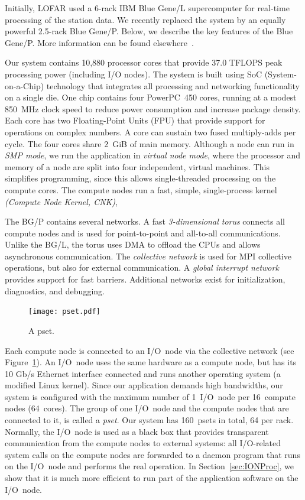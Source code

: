 \documentclass{sig-alternate}
\begin{document}
Initially, LOFAR used a 6-rack IBM Blue Gene/L supercomputer for real-time
processing of the station data.
We recently replaced the system by an equally powerful 2.5-rack Blue Gene/P.
Below, we describe the key features of the Blue Gene/P.
More information can be found elsewhere~\cite{IBM:08}.

Our system contains 10,880 processor cores that provide 37.0 TFLOPS peak
processing power (including I/O nodes).
The system is built using SoC (System-on-a-Chip) technology that integrates
all processing and networking functionality on a single die.
One chip contains four PowerPC~450 cores, running at a modest 850~MHz clock
speed to reduce power consumption and increase package density.
Each core has two Floating-Point Units (FPU) that provide support for
operations on complex numbers.
A core can sustain two fused multiply-adds per cycle.
The four cores share 2~GiB of main memory.
Although a node can run in \emph{SMP mode}, we run the application in
\emph{virtual node mode}, where the processor and memory of a node are split
into four independent, virtual machines.
This simplifies programming, since this allows single-threaded processing
on the compute cores.  %
The compute nodes run a fast, simple, single-process kernel
\emph{(Compute Node Kernel, CNK)},

The BG/P contains several networks.
A fast \emph{3-dimensional torus\/} connects all compute nodes and is used
for point-to-point and all-to-all communications.
Unlike the BG/L, the torus uses DMA to offload the CPUs and allows
asynchronous communication.
The \emph{collective network\/} is used for MPI collective operations,
but also for external communication.
A \emph{global interrupt network\/} provides support for fast barriers.
Additional networks exist for initialization, diagnostics, and debugging.

\begin{figure}[ht]
\texttt{[image: pset.pdf]}
\caption{A pset.}
\label{fig:pset}
\end{figure}

Each compute node is connected to an I/O~node via the collective network
(see Figure~\ref{fig:pset}).
An I/O~node uses the same hardware as a compute node, but has its 10 Gb/s Ethernet
interface connected and runs another operating system (a modified Linux kernel).
Since our application demands high bandwidths, our system is configured with
the maximum number of 1~I/O~node per 16~compute nodes (64~cores).
The group of one I/O~node and the compute nodes that are connected to it,
is called a \emph{pset}.
Our system has 160~psets in total, 64 per rack.
Normally, the I/O~node is used as a black box that provides transparent
communication from the compute nodes to external systems: all I/O-related
system calls on the compute nodes are forwarded to a daemon program that runs
on the I/O~node and performs the real operation.
In Section~\ref{sec:IONProc}, we show that it is much more
efficient to run part of the application software on the I/O~node.
\end{document}
